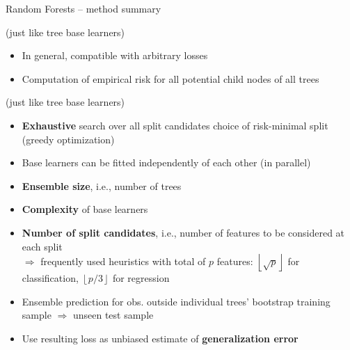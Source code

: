 \begin{frame}{Random Forests -- method summary}

 (just like tree base learners)

\begin{itemize}
  \item In general, compatible with arbitrary losses
  \item Computation of empirical risk for all potential child nodes of all trees
\end{itemize}

\medskip

 (just like tree base learners)

\begin{itemize}
    \item \textbf{Exhaustive} search over all split candidates choice of risk-minimal split (greedy optimization)
    \item Base learners can be fitted independently of each other (in parallel)
\end{itemize}

\medskip


\begin{itemize}
  \item \textbf{Ensemble size}, i.e., number of trees
  \item \textbf{Complexity} of base learners
  \item \textbf{Number of split candidates}, i.e., number of features to be
  considered at each split \\
  $\Rightarrow$ frequently used heuristics with total of $p$ features: 
  $\left \lfloor{\sqrt{p}}\right \rfloor$ for classification,
  $\left \lfloor{p/3}\right \rfloor$ for regression
\end{itemize}

\medskip

\begin{itemize}
  \item Ensemble prediction for obs. outside individual trees' bootstrap training sample $\Rightarrow$ unseen test sample
  \item Use resulting loss as unbiased estimate of \textbf{generalization error}
\end{itemize}

  
\end{frame}

